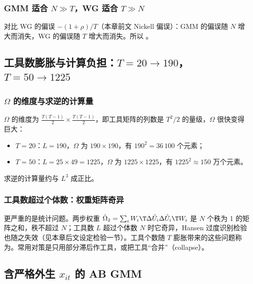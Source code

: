 \subsubsection{GMM 适合 \texorpdfstring{$N\gg T$}{N >> T}，WG 适合 \texorpdfstring{$T\gg N$}{T >> N}}

对比 WG 的偏误 $-(1+\rho)/T$（本章前文 Nickell 偏误）：GMM 的偏误随 $N$ 增大而消失，WG 的偏误随 $T$ 增大而消失。所以 。

\subsection{工具数膨胀与计算负担：\texorpdfstring{$T=20\to190$}{T=20 -> 190}，\texorpdfstring{$T=50\to1225$}{T=50 -> 1225}}

\subsubsection{\texorpdfstring{$\Omega$}{Omega} 的维度与求逆的计算量}

$\Omega$ 的维度为 $\frac{T(T-1)}{2}\times\frac{T(T-1)}{2}$，即工具矩阵的列数是 $T^2/2$ 的量级，$\Omega$ 很快变得巨大：
\begin{itemize}
  \item $T=20$：$L=190$，$\Omega$ 为 $190\times190$，有 $190^2=36\,100$ 个元素；
  \item $T=50$：$L=25\times49=1225$，$\Omega$ 为 $1225\times1225$，有 $1225^2\approx150$ 万个元素。
\end{itemize}
求逆的计算量约与 $L^3$ 成正比。

\subsubsection{工具数超过个体数：权重矩阵奇异}

更严重的是统计问题。两步权重 $\hat\Omega_2=\sum_iW_i\T\Delta\hat U_i\Delta\hat U_i\T W_i$ 是 $N$ 个秩为 1 的矩阵之和，秩不超过 $N$；工具数 $L$ 超过个体数 $N$ 时它奇异，Hansen 过度识别检验也随之失效（见本章后文设定检验一节）。工具个数随 $T$ 膨胀带来的这些问题称为。常用对策是只用部分滞后作工具，或把工具“合并”（collapse）。

\subsection{含严格外生 \texorpdfstring{$x_{it}$}{x\_it} 的 AB GMM}

